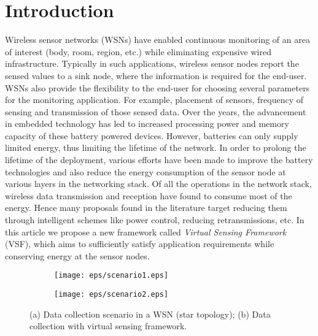 \documentclass[a4paper,conference]{IEEEtran}
\begin{document}
\section{Introduction}
\label{intro}
Wireless sensor networks (WSNs) have enabled continuous monitoring of an area of interest (body, room, region, etc.) while eliminating expensive wired infrastructure. Typically in such applications, wireless sensor nodes report the sensed values to a sink node, where the information is required for the end-user. WSNs also provide the flexibility to the end-user for choosing several parameters for the monitoring application. For example, placement of sensors, frequency of sensing and transmission of those sensed data. Over the years, the advancement in embedded technology has led to increased processing power and memory capacity of these battery powered devices. However, batteries can only supply limited energy, thus limiting the lifetime of the network. In order to prolong the lifetime of the deployment, various efforts have been made to improve the battery technologies and also reduce the energy consumption of the sensor node at various layers in the networking stack. Of all the operations in the network stack, wireless data transmission and reception have found to consume most of the energy. Hence many proposals found in the literature target reducing them through intelligent schemes like power control, reducing retransmissions, etc. In this article we propose a new framework called {\it Virtual Sensing Framework} (VSF), which aims to sufficiently satisfy application requirements while conserving energy at the sensor nodes.
\begin{figure}
\centering
	\begin{subfigure}[b]{0.42\linewidth}
		\texttt{[image: eps/scenario1.eps]}
		\caption{}
		\label{fig:scenario1}
	\end{subfigure}
\hspace{2em}
	\begin{subfigure}[b]{0.42\linewidth}
		\texttt{[image: eps/scenario2.eps]}
		\caption{}
		\label{fig:scenario2}
	\end{subfigure}
\caption{(a) Data collection scenario in a WSN (star topology); (b) Data collection with virtual sensing framework.} 
\label{fig:wsn}
\end{figure}
\end{document}
